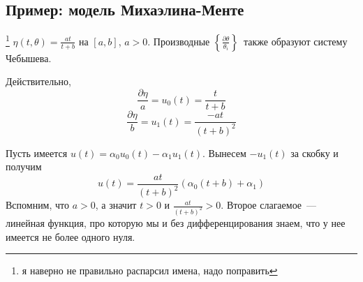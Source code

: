 \subsection{Пример: модель Михаэлина-Менте}\footnote{я наверно не правильно распарсил имена, надо поправить}
$\eta(t, \theta) = \frac{at}{t+b}$ на $[a, b]$, $a > 0$. 
Производные $\left\{\frac{\partial\theta}{\theta_i}\right\}$ также образуют систему Чебышева. 

Действительно,
$$\frac{\partial\eta}{a} = u_0(t) = \frac{t}{t+b}$$
$$ \frac{\partial\eta}{b} = u_1(t) = \frac{-at}{(t+b)^2}$$

Пусть имеется $u(t) = \alpha_0 u_0(t) - \alpha_1u_1(t)$. Вынесем $-u_1(t)$ за скобку и получим
$$u(t) = \frac{at}{(t+b)^2}\left( \alpha_0 (t+b) + \alpha_1  \right)$$
Вспомним, что $a >0$, а значит $t > 0$ и $\frac{at}{(t+b)^2} > 0$. Второе слагаемое — линейная функция, про которую мы и без дифференцирования знаем, что у нее имеется не более одного нуля.


